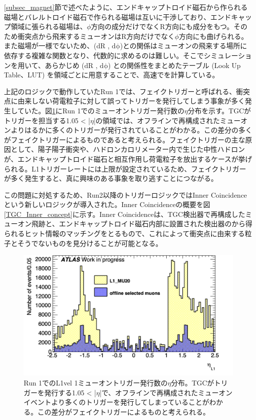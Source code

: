 \ref{subsec_magnet}節で述べたように、エンドキャップトロイド磁石から作られる磁場とバレルトロイド磁石で作られる磁場は互いに干渉しており、エンドキャップ領域に張られる磁場は、$\phi$方向の成分だけでなくR方向にも成分をもつ。そのため衝突点から飛来するミューオンはR方向だけでなく$\phi$方向にも曲げられる。また磁場が一様でないため、($\mathrm{dR}$ , $\mathrm{d\phi}$)と\pt の関係はミューオンの飛来する場所に依存する複雑な関数となり、代数的に求めるのは難しい。そこでシミュレーションを用いて、あらかじめ  ($\mathrm{dR}$ , $\mathrm{d\phi}$) と\pt の関係性をまとめたテーブル  (Look Up Table、LUT) を領域ごとに用意することで、高速で\pt を計算している。


上記のロジックで動作していたRun 1では、フェイクトリガーと呼ばれる、衝突点に由来しない荷電粒子に対して誤ってトリガーを発行してしまう事象が多く発生していた。図\ref{TGC_faketrigger}にRun 1でのミューオントリガー発行数の$\eta$分布を示す。TGCがトリガーを担当する1.05 < |$\eta$|の領域では、オフラインで再構成されたミューオンよりはるかに多くのトリガーが発行されていることがわかる。この差分の多くがフェイクトリガーによるものであると考えられる。フェイクトリガーの主な原因として、陽子陽子衝突や、ハドロンカロリメーター内で生じた中性ハドロンが、エンドキャップトロイド磁石と相互作用し荷電粒子を放出するケースが挙げられる。L1トリガーレートには上限が設定されているため、フェイクトリガーが多く発生すると、真に興味のある事象を取り逃すことにつながる。

この問題に対処するため、Run2以降のトリガーロジックではInner Coincidenceという新しいロジックが導入された。Inner Coincidenceの概要を図\ref{TGC_Inner_concept}に示す。Inner Coincidenceは、TGC検出器で再構成したミューオン飛跡と、エンドキャップトロイド磁石内部に設置された検出器のから得られるヒット情報のマッチングをとるもので、これによって衝突点に由来する粒子とそうでないものを見分けることが可能となる。


\begin{figure} 
\centering
\includegraphics[width=16cm]{fig/Intro/TGC_faketrigger.png}
\caption[Run-1での\pt 閾値]{Run 1でのL1vel 1ミューオントリガー発行数の$\eta$分布。TGCがトリガーを発行する1.05 < |$\eta$|で、オフラインで再構成されたミューオンイベントより多くのトリガーを発行してしまっていることがわかる。この差分がフェイクトリガーによるものと考えられる。}
\label{TGC_faketrigger}
\end{figure}

